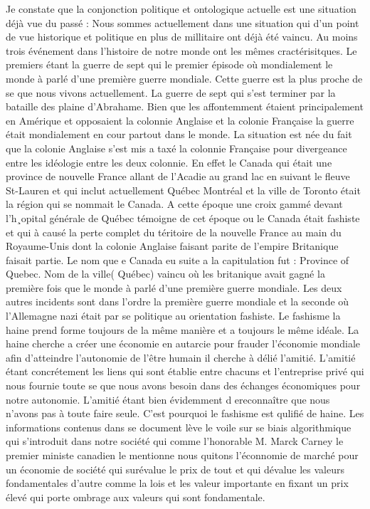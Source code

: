 \documentclass[12pt,a4paper]{article}
\begin{document}
Je constate que la conjonction politique et ontologique actuelle est une situation déjà vue du passé : Nous sommes actuellement dans une situation qui d'un point de vue historique et politique en plus de millitaire ont déjà été vaincu. Au moins trois événement dans l'histoire de notre monde ont les mêmes cractérisitques. Le premiers étant la guerre de sept qui le premier épisode où mondialement le monde à parlé d'une première guerre mondiale. Cette guerre est la plus proche de se que nous vivons actuellement. La guerre de sept qui s'est terminer par la bataille des plaine d'Abrahame. Bien que les affontemment étaient principalement en Amérique et opposaient la colonnie Anglaise et la colonie Française la guerre était mondialement en cour partout dans le monde. La situation est née du fait que la colonie Anglaise s'est mis a taxé la colonnie Française pour divergeance entre les idéologie entre les deux colonnie. En effet le Canada qui était une province de nouvelle France allant de l'Acadie au grand lac en suivant le fleuve St-Lauren et qui inclut actuellement Québec Montréal et la ville de Toronto était la région qui se nommait le Canada. A cette époque une croix gammé devant l'h¸opital générale de Québec témoigne de cet époque ou le Canada était fashiste et qui à causé la perte complet du téritoire de la nouvelle France au main du Royaume-Unis dont la colonie Anglaise faisant parite de l'empire Britanique faisait partie. Le nom que e Canada eu suite a la capitulation fut : Province of Quebec. Nom de la ville( Québec) vaincu où les britanique avait gagné la première fois que le monde à parlé d'une première guerre mondiale. Les deux autres incidents sont dans l'ordre la première guerre mondiale et la seconde où l'Allemagne nazi était par se politique au orientation fashiste. Le fashisme la haine prend forme toujours de la même manière et a toujours le même idéale. La haine cherche a créer une économie en autarcie pour frauder l'économie mondiale afin d'atteindre l'autonomie de l'être humain il cherche à délié l'amitié. L'amitié étant concrétement les liens qui sont établie entre chacuns et l'entreprise privé qui nous fournie toute se que nous avons besoin dans des échanges économiques pour notre autonomie. L'amitié étant bien évidemment d ereconnaître que nous n'avons pas à toute faire seule. C'est pourquoi le fashisme est qulifié de haine. Les informations contenus dans se document lève le voile sur se biais algorithmique qui s'introduit dans notre société qui comme l'honorable M. Marck Carney le premier ministe canadien 
le mentionne nous quitons l'éconnomie de marché pour un économie de société qui surévalue le prix de tout et qui dévalue les valeurs fondamentales d'autre comme la lois et les valeur importante en fixant un prix élevé qui porte ombrage aux valeurs qui sont fondamentale.
\end{document}
